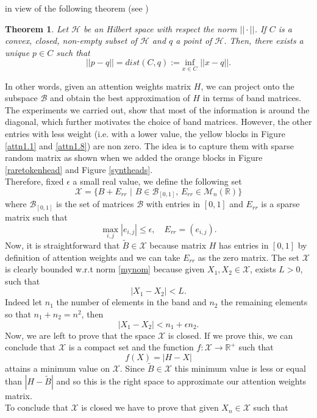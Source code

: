 \documentclass[11pt]{article}
\theoremstyle{plain}
\newtheorem{theorem}{Theorem}[section]
\theoremstyle{remark}
\theoremstyle{definition}
\theoremstyle{plain}
\theoremstyle{plain}
\begin{document}
in view of the following theorem (see \cite{Damianone})
\begin{theorem}
    Let $\mathcal{H}$ be an Hilbert space with respect the norm $||\cdot ||$. If $C$ is a convex, closed, non-empty subset of $\mathcal{H}$ and $q$ a point of $\mathcal{H}$. Then, there exists a unique $p \in C$ such that
    \[
    ||p-q||=dist(C,q):=\underset{x \in C}{\text{inf}}\,\, ||x-q||.
    \]
\end{theorem} \noindent
In other words, given an attention weights matrix $H$, we can project onto the subspace $\mathcal{B}$ and obtain the best approximation of $H$ in terms of band matrices. The experiments we carried out, show that most of the information is around the diagonal, which further motivates the choice of band matrices. However, the other entries with less weight (i.e. with a lower value, the yellow blocks in Figure \ref{attn1.1} and \ref{attn1.8}) are non zero. The idea is to capture them with sparse random matrix as shown when we added the orange blocks in Figure \ref{raretokenhead} and Figure \ref{syntheads}. \\
Therefore, fixed $\epsilon$ a small real value, we define the following set
\[
\mathcal{X}=\{ B+E_{rr}\,\, |\,\, B \in \mathcal{B}_{[0,1]},\, E_{rr} \in \mathcal{M}_n(\mathbb{R})\}
\]
where $\mathcal{B}_{[0,1]}$ is the set of matrices $\mathcal{B}$ with entries in $[0,1]$ and $E_{rr}$ is a sparse matrix such that
\begin{equation} \label{maxcond}
    \max_{i,j} |e_{i,j}|\leq \epsilon, \quad  E_{rr}=(e_{i,j}).
\end{equation}
Now, it is straightforward that $\tilde{B} \in \mathcal{X}$ because matrix $H$ has entries in $[0,1]$ by definition of attention weights and we can take $E_{rr}$ as the zero matrix. The set $\mathcal{X}$ is clearly bounded w.r.t norm \eqref{mynom} because given $X_1,X_2 \in \mathcal{X}$, exists $L>0$, such that
\[
|X_1-X_2|<L.
\]
Indeed let $n_1$ the number of elements in the band and $n_2$ the remaining elements so that $n_1+n_2=n^2$, then 
\[
|X_1-X_2|<n_1+\epsilon n_2.
\]
Now, we are left to prove that the space $\mathcal{X}$ is closed. If we prove this, we can conclude that $\mathcal{X}$ is a compact set and the function $f \colon \mathcal{X} \to \mathbb{R}^{+}$ such that
\[
f(X)=|H-X|
\]
attains a minimum value on $\mathcal{X}$. Since $\tilde{B} \in \mathcal{X}$ this minimum value is less or equal than $|H - \tilde{B}|$ and so this is the right space to approximate our attention weights matrix. \\
To conclude that $\mathcal{X}$ is closed we have to prove that given $X_n \in \mathcal{X}$ such that
\end{document}
